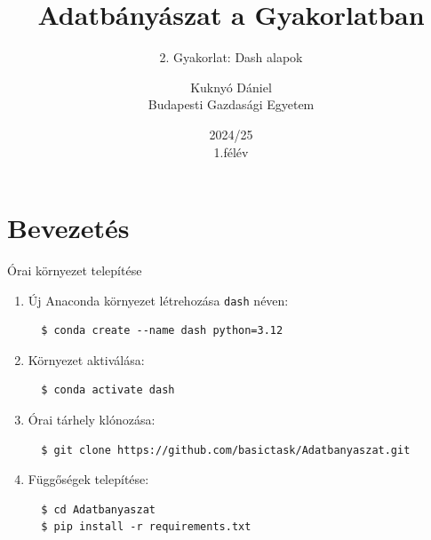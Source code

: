 \documentclass[english, aspectratio=169]{beamer}
\makeatletter
\newcommand\makebeamertitle{\frame{\maketitle}}
\let\origtableofcontents=\tableofcontents
\def\tableofcontents{\@ifnextchar[{\origtableofcontents}{\gobbletableofcontents}}
\def\gobbletableofcontents#1{\origtableofcontents}
\makeatother
\begin{document}
\section{Bevezetés}
\title[]{Adatbányászat a Gyakorlatban}
\subtitle{2. Gyakorlat: Dash alapok}
\author[Kuknyó Dániel]{Kuknyó Dániel\\Budapesti Gazdasági Egyetem}
\date{2024/25\\1.félév}
\makebeamertitle

\begin{frame}
\tableofcontents{}
\end{frame}

\begin{frame}
\tableofcontents[currentsection]
\end{frame}

\begin{frame}[fragile]{Órai környezet telepítése}
\begin{enumerate}
  \item Új Anaconda környezet létrehozása \texttt{dash} néven:
  \begin{lstlisting}
  $ conda create --name dash python=3.12
  \end{lstlisting}
  \item Környezet aktiválása:
  \begin{lstlisting}
  $ conda activate dash
  \end{lstlisting}
  \item Órai tárhely klónozása:
  \begin{lstlisting}
  $ git clone https://github.com/basictask/Adatbanyaszat.git
  \end{lstlisting}
  \item Függőségek telepítése:
  \begin{lstlisting}
  $ cd Adatbanyaszat
  $ pip install -r requirements.txt
  \end{lstlisting}
\end{enumerate}
\end{frame}
\end{document}
